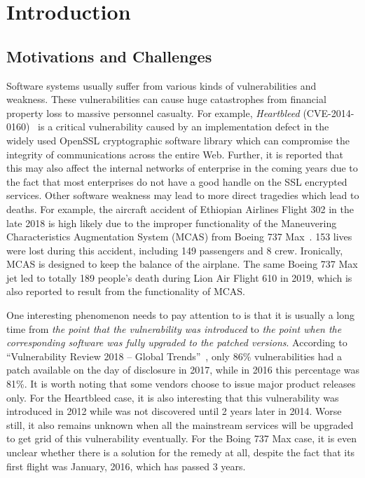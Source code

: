 
\chapter{Introduction} \label{ch:introduction}


\section{Motivations and Challenges}
Software systems usually suffer from various kinds of vulnerabilities and weakness. These vulnerabilities can cause huge catastrophes from financial property loss to massive personnel casualty. For example, \emph{Heartbleed} (CVE-2014-0160)~\cite{heartbleed} is a critical vulnerability caused by an implementation defect in the widely used OpenSSL cryptographic software library which can compromise the integrity of communications across the entire Web. Further, it is reported that this may also affect the internal networks of enterprise in the coming years due to the fact that most enterprises do not have a good handle on the SSL encrypted services. Other software weakness may lead to more direct tragedies which lead to deaths. For example, the aircraft accident of Ethiopian Airlines Flight 302 in the late 2018 is high likely due to the improper functionality of the Maneuvering Characteristics Augmentation System (MCAS) from Boeing 737 Max~\cite{boeing_Ethiopian}. 153 lives were lost during this accident, including 149 passengers and 8 crew. Ironically, MCAS is designed to keep the balance of the airplane. The same Boeing 737 Max jet led to totally 189 people's death during Lion Air Flight 610 in 2019, which is also reported to result from the functionality of MCAS.

One interesting phenomenon needs to pay attention to is that it is usually a long time from \emph{the point that the vulnerability was introduced} to \emph{the point when the corresponding software was fully upgraded to the patched versions}. According to ``Vulnerability Review 2018 -- Global Trends''~\cite{vul_flexera18}, only 86\% vulnerabilities had a patch available on the day of disclosure in 2017, while in 2016 this percentage was 81\%. It is worth noting that some vendors choose to issue major product releases only. For the Heartbleed case, it is also interesting that this vulnerability was introduced in 2012 while was not discovered until 2 years later in 2014. Worse still, it also remains unknown when all the mainstream services will be upgraded to get grid of this vulnerability eventually. For the Boing 737 Max case, it is even unclear whether there is a solution for the remedy at all, despite the fact that its first flight was January, 2016, which has passed 3 years.

